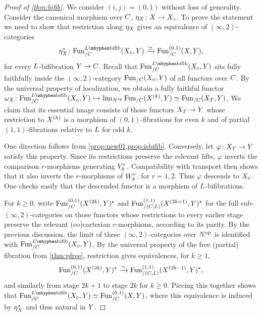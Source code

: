 \documentclass[a4paper,reqno,twoside]{amsart}
\begin{document}
\medskip
\begin{proof}[Proof of \cref{thm:bifib}]
	We consider $(i,j)=(0,1)$ without loss of generality. Consider the canonical morphism over $\relax{C}$, $\eta_{\relax{X}}\colon \relax{X} \to \relax{X}_{\diamond}$. To prove the statement we need to show that restriction along $\eta_{\relax{X}}$ gives an equivalence of $(\infty,2)$-categories
	\[
		\eta_{\cX}^* \colon \Fun_{/\cC}^{\cL\mhyphen\bifib}(\cX_{\diamond},\cY) \xrightarrow{\simeq}\Fun^{(0,1)}_{/\cC}(\cX,\cY),
	\]
	for every $\relax{L}$-bifibration $\relax{Y} \to \relax{C}$. Recall that $\Fun_{/\cC}^{\cL\mhyphen\bifib}(\cX_{\diamond},\cY)$ sits fully faithfully inside the $(\infty,2)$-category $\mathrm{Fun}_{/\relax{C}}(\relax{X}_{\diamond},\relax{Y})$ of all functors over $\relax{C}$. By the universal property of localization, we obtain a fully faithful functor $\omega_{\cX} \colon \Fun_{/\cC}^{\cL\mhyphen\bifib}(\cX_{\diamond},\cY) \hookrightarrow \lim_{\mathbb{N}^\op}\Fun_{/\cC}(\cX^{(k)},\cY) \simeq \Fun_{/\cC}(\cX_T,\cY)$. We claim that its essential image consists of those functors $\relax{X}_T\to\relax{Y}$ whose restriction to $\relax{X}^{(k)}$ is a morphism of $(0,1)$-fibrations for even $k$ and of partial $(1,1)$-fibrations relative to $\relax{L}$ for odd $k$.

	One direction follows from \cref{prop:new01,prop:isbifib}. Conversely, let $\varphi\colon\relax{X}_T\to\relax{Y}$ satisfy this property. Since its restrictions preserve the relevant lifts, $\varphi$ inverts the comparison $r$-morphisms generating $\relax{V}_k^r$. Compatibility with transport then shows that it also inverts the $r$-morphisms of $\relax{W}_k^r$, for $r=1,2$. Thus $\varphi$ descends to $\relax{X}_\diamond$. One checks easily that the descended functor is a morphism of $\relax{L}$-bifibrations.

	For $k\geq0$, write $\mathrm{Fun}^{(0,1)}_{/\relax{C}}(\relax{X}^{(2k)},\relax{Y})^{\star}$ and $\mathrm{Fun}^{(1,1)}_{/(\relax{C},\relax{L})}(\relax{X}^{(2k+1)},\relax{Y})^{\star}$ for the full sub-$(\infty,2)$-categories on those functors whose restrictions to every earlier stage preserve the relevant (co)cartesian $r$-morphisms, according to its parity. By the previous discussion, the limit of these $(\infty,2)$-categories over $\relax N^{\mathrm{op}}$ is identified with $\Fun_{/\cC}^{\cL\mhyphen\bifib}(\cX_{\diamond},\cY)$. By the universal property of the free (partial) fibration from \cref{thm:pfree}, restriction gives equivalences, for $k\geq1$,
	\[
		\mathrm{Fun}^{(0,1)}_{/\relax{C}}(\relax{X}^{(2k)},\relax{Y})^{\star} \xrightarrow{\simeq}\mathrm{Fun}^{(1,1)}_{/(\relax{C},\relax{L})}(\relax{X}^{(2k-1)},\relax{Y})^{\star},
	\]
	and similarly from stage $2k+1$ to stage $2k$ for $k\geq0$. Piecing this together shows that $\Fun_{/\cC}^{\cL\mhyphen\bifib}(\cX_{\diamond},\cY) \simeq \Fun^{(0,1)}_{/\cC}(\cX,\cY)$, where this equivalence is induced by $\eta_{\relax{X}}^*$ and thus natural in $\relax{Y}$.
\end{proof}
\end{document}
